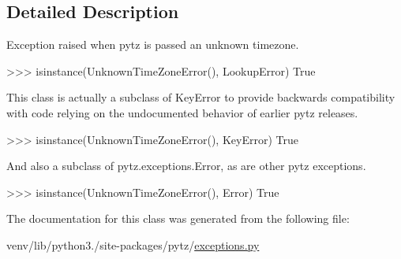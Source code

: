 \subsection{Detailed Description}
\begin{DoxyVerb}Exception raised when pytz is passed an unknown timezone.

>>> isinstance(UnknownTimeZoneError(), LookupError)
True

This class is actually a subclass of KeyError to provide backwards
compatibility with code relying on the undocumented behavior of earlier
pytz releases.

>>> isinstance(UnknownTimeZoneError(), KeyError)
True

And also a subclass of pytz.exceptions.Error, as are other pytz
exceptions.

>>> isinstance(UnknownTimeZoneError(), Error)
True\end{DoxyVerb}
 

The documentation for this class was generated from the following file\+:\begin{DoxyCompactItemize}
\item 
venv/lib/python3./site-\/packages/pytz/\hyperlink{pytz_2exceptions_8py}{exceptions.\+py}\end{DoxyCompactItemize}
